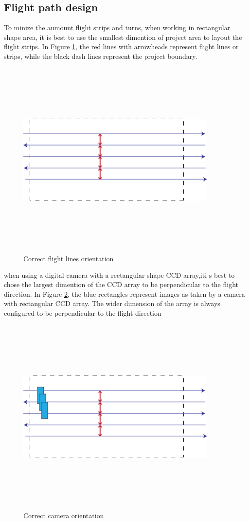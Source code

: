 \subsection{Flight path design}
To minize the aumount flight strips and turns, when working in rectangular shape area, it is best to use the smallest dimention of project area to layout the flight strips. In Figure \ref{fig:line_orientaion}, the red lines with arrowheads represent flight lines or strips, while the black dash lines represent the project boundary.
\begin{figure}[H]
\centering
\includegraphics[width=10cm,height=10cm,keepaspectratio]{imagenes/Fligth_path.png}
\caption{Correct flight lines orientation}
\label{fig:line_orientaion}
\end{figure}
when using a digital camera with a rectangular shape CCD array,iti s best to chose the largest dimention of the CCD array to be perpendicular to the flight direction. In Figure \ref{fig:camera_orientaion}, the blue rectangles represent images as taken by a camera with rectangular CCD array. The wider dimension of the array is always configured to be perpendicular to the flight direction\cite{GCP}
\begin{figure}[H]
\centering
\includegraphics[width=10cm,height=10cm,keepaspectratio]{imagenes/Camera_Orientation.png}
\caption{Correct camera orientation}
\label{fig:camera_orientaion}
\end{figure}
